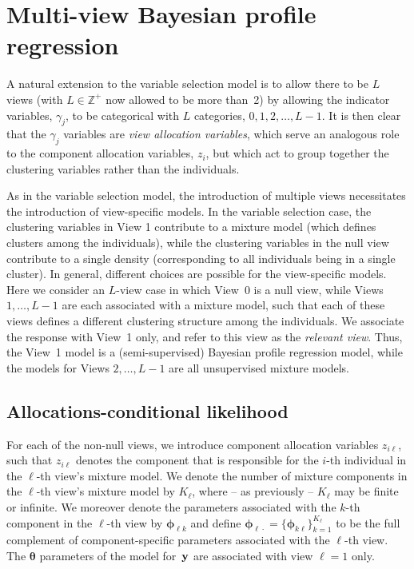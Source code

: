 \documentclass[12pt]{article}
\begin{document}

\section{Multi-view Bayesian profile regression}\label{multi-view}
A natural extension to the variable selection model is to allow there to be $L$ views (with $L \in \mathbb{Z}^+$ now allowed to be more than~2) by allowing the indicator variables, $\gamma_j$, to be categorical with $L$ categories, $0, 1, 2, \ldots, L-1$.  It is then clear that the $\gamma_j$ variables are {\em view allocation variables}, which serve an analogous role to the component allocation variables, $z_i$, but which act to group together the clustering variables rather than the individuals.

As in the variable selection model, the introduction of multiple views necessitates the introduction of view-specific models.  In the variable selection case, the clustering variables in View 1 contribute to a mixture model (which defines clusters among the individuals), while the clustering variables in the null view contribute to a single density (corresponding to all individuals being in a single cluster).  In general, different choices are possible for the view-specific models.  Here we consider an $L$-view case in which View~0 is a null view, while Views $1, \ldots, L-1$ are each associated with a mixture model, such that each of these views defines a different clustering structure among the individuals.  We associate the response with View~1 only, and refer to this view as the {\em relevant view}.  Thus, the View~1 model is a (semi-supervised) Bayesian profile regression model, while the models for Views $2, \ldots, L - 1$ are all unsupervised mixture models.  %


\subsection{Allocations-conditional likelihood}       
For each of the non-null views, we introduce component allocation variables $z_{i\ell}$, such that $z_{i\ell}$ denotes the component that is responsible for the $i$-th individual in the $\ell$-th view's mixture model.  We denote the number of mixture components in the $\ell$-th view's mixture model by $K_\ell$, where -- as previously -- $K_\ell$ may be finite or infinite.  We moreover denote the parameters associated with the $k$-th component in the $\ell$-th view by $\boldsymbol{\phi}_{\ell k}$ and define $\boldsymbol{\phi}_{\ell\cdot} = \{ \boldsymbol{\phi}_{k\ell}\}_{k = 1}^{K_\ell}$ to be the full complement of component-specific parameters associated with the $\ell$-th view.  The $\boldsymbol{\theta}$ parameters of the model for~${\bf y}$ are associated with view $\ell = 1$ only.
\end{document}
